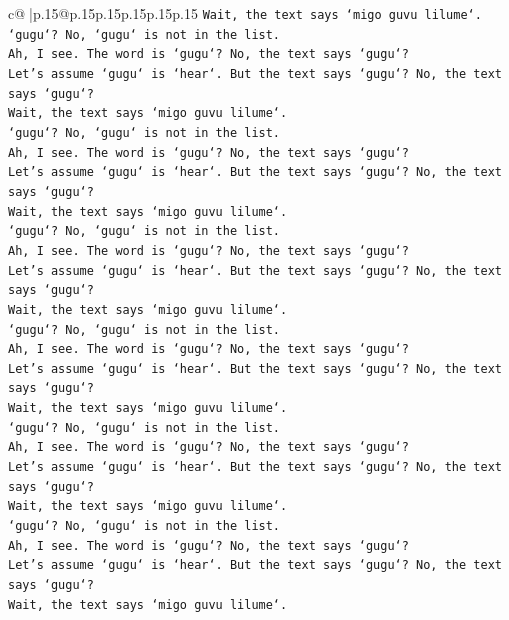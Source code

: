 \documentclass{article}
\begin{document}
{\begin{supertabular}{c@{$\;$}|p{.15\linewidth}@{}p{.15\linewidth}p{.15\linewidth}p{.15\linewidth}p{.15\linewidth}p{.15\linewidth}}
{{{\texttt{Wait, the text says `migo guvu lilume`.} \\
\texttt{`gugu`? No, `gugu` is not in the list.} \\
\texttt{Ah, I see. The word is `gugu`? No, the text says `gugu`?} \\
\texttt{Let's assume `gugu` is `hear`. But the text says `gugu`? No, the text says `gugu`?} \\
\texttt{Wait, the text says `migo guvu lilume`.} \\
\texttt{`gugu`? No, `gugu` is not in the list.} \\
\texttt{Ah, I see. The word is `gugu`? No, the text says `gugu`?} \\
\texttt{Let's assume `gugu` is `hear`. But the text says `gugu`? No, the text says `gugu`?} \\
\texttt{Wait, the text says `migo guvu lilume`.} \\
\texttt{`gugu`? No, `gugu` is not in the list.} \\
\texttt{Ah, I see. The word is `gugu`? No, the text says `gugu`?} \\
\texttt{Let's assume `gugu` is `hear`. But the text says `gugu`? No, the text says `gugu`?} \\
\texttt{Wait, the text says `migo guvu lilume`.} \\
\texttt{`gugu`? No, `gugu` is not in the list.} \\
\texttt{Ah, I see. The word is `gugu`? No, the text says `gugu`?} \\
\texttt{Let's assume `gugu` is `hear`. But the text says `gugu`? No, the text says `gugu`?} \\
\texttt{Wait, the text says `migo guvu lilume`.} \\
\texttt{`gugu`? No, `gugu` is not in the list.} \\
\texttt{Ah, I see. The word is `gugu`? No, the text says `gugu`?} \\
\texttt{Let's assume `gugu` is `hear`. But the text says `gugu`? No, the text says `gugu`?} \\
\texttt{Wait, the text says `migo guvu lilume`.} \\
\texttt{`gugu`? No, `gugu` is not in the list.} \\
\texttt{Ah, I see. The word is `gugu`? No, the text says `gugu`?} \\
\texttt{Let's assume `gugu` is `hear`. But the text says `gugu`? No, the text says `gugu`?} \\
\texttt{Wait, the text says `migo guvu lilume`.} \\
}}}
\end{supertabular}}
\end{document}
